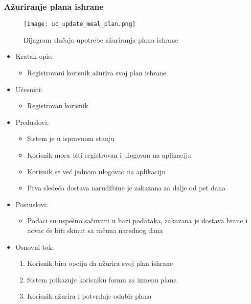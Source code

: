 \subsubsection{Ažuriranje plana ishrane}

\begin{figure}[H]
\begin{center}
\texttt{[image: uc\_update\_meal\_plan.png]}
\end{center}
    \caption{Dijagram slučaja upotrebe ažuriranja plana ishrane}
\label{fig:UCUpdateMealPlan}
\end{figure}

\begin{itemize}
    \item Kratak opis:
        \begin{itemize}
            \item Registrovani korisnik ažurira svoj plan ishrane 
        \end{itemize}
    \item Učesnici:
        \begin{itemize}
            \item Registrovan korisnik
        \end{itemize}
    \item Preduslovi:
        \begin{itemize}
            \item Sistem je u ispravnom stanju
            \item Korisnik mora biti registrovan i ulogovan na aplikaciju
            \item Korisnik se već jednom ulogovao na aplikaciju
            \item Prva sledeća dostava narudžbine je zakazana za dalje od pet dana
        \end{itemize}
    \item Postuslovi:
        \begin{itemize}
            \item Podaci su uspešno sačuvani u bazi podataka, zakazana je dostava hrane i novac će biti skinut sa računa narednog dana
        \end{itemize}
    \item Osnovni tok:
        \begin{enumerate}
            \item Korisnik bira opciju da ažurira svoj plan ishrane
            \item Sistem prikazuje korisniku formu za izmenu plana
            \item Korisnik ažurira i potvrđuje odabir plana

\end{enumerate}
\end{itemize}
